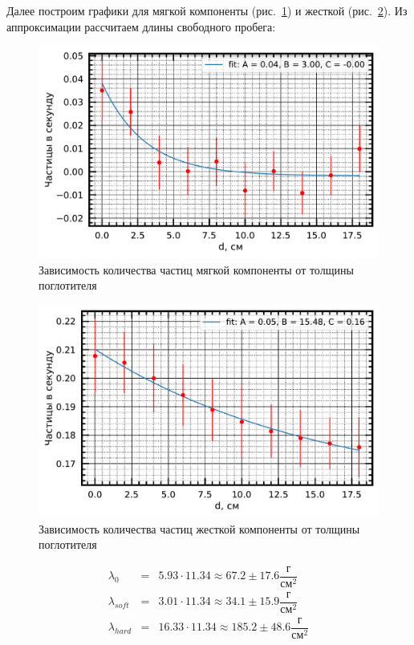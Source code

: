 \documentclass[reprint, nofootinbib, nobalancelastpage, 10pt]{revtex4-2}
\begin{document}
Далее построим графики для мягкой компоненты (рис.~\ref{graph:soft}) и жесткой
(рис.~\ref{graph:hard}). Из аппроксимации рассчитаем длины свободного пробега:

\begin{figure}[h!]
	\includegraphics[width=0.95\linewidth]{plot_2.pdf}
	\caption{Зависимость количества частиц мягкой компоненты от толщины поглотителя}
	\label{graph:soft}
\end{figure}

\begin{figure}[h!]
	\includegraphics[width=0.95\linewidth]{plot_3.pdf}
	\caption{Зависимость количества частиц жесткой компоненты от толщины поглотителя}
	\label{graph:hard}
\end{figure}

\begin{eqnarray*}
	\lambda_0 &=& 5.93 \cdot 11.34 \approx 67.2 \pm 17.6 \dfrac{\text{г}}{\text{см}^2}\\
	\lambda_{soft} &=& 3.01 \cdot 11.34 \approx 34.1 \pm 15.9 \dfrac{\text{г}}{\text{см}^2}\\
	\lambda_{hard} &=& 16.33 \cdot 11.34 \approx 185.2 \pm 48.6 \dfrac{\text{г}}{\text{см}^2}
\end{eqnarray*}
\end{document}
